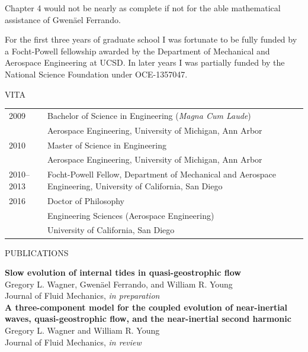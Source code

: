 \documentclass[12pt, oneside]{book}
\begin{document}
Chapter 4 would not be nearly as complete if not for the able mathematical assistance of Gwen\"ael Ferrando. 

For the first three years of graduate school I was fortunate to be fully funded by a Focht-Powell fellowship awarded by the Department of Mechanical and Aerospace Engineering at UCSD.  In later years I was partially funded by the National Science Foundation under OCE-1357047. 


\clearpage {} {}
\singlespacing
\begingroup
	\centering 
	VITA \medskip \par
\endgroup

\begin{table}[htp!]
\begin{tabular}{p{12ex} p{72ex}} 
2009 & Bachelor of Science in Engineering (\textit{Magna Cum Laude}) \\ 
& Aerospace Engineering, University of Michigan, Ann Arbor \\[2ex]
2010 & Master of Science in Engineering \\
& Aerospace Engineering, University of Michigan, Ann Arbor \\[2ex]
2010--2013 & Focht-Powell Fellow, Department of Mechanical and Aerospace Engineering, University of California, San Diego \\[2ex]
2016 & Doctor of Philosophy \\
& Engineering Sciences (Aerospace Engineering) \\
& University of California, San Diego
\end{tabular}
\end{table}

\bigskip

\begingroup
	\centering 
	PUBLICATIONS \bigskip \par
\endgroup

\noindent \textbf{Slow evolution of internal tides in quasi-geostrophic flow} \\
Gregory L. Wagner, Gwen\"ael Ferrando, and William R. Young \\
Journal of Fluid Mechanics, {\it in preparation} \\

\noindent \textbf{A three-component model for the coupled evolution of near-inertial waves, quasi-geostrophic flow, and the near-inertial second harmonic} \\
Gregory L. Wagner and William R. Young \\
Journal of Fluid Mechanics, {\it in review} \\
\end{document}
